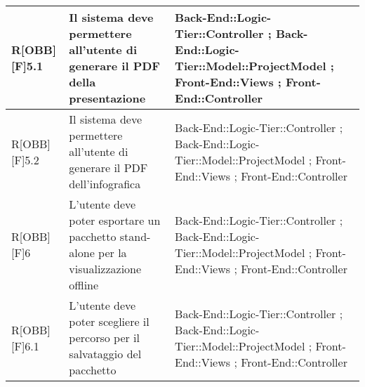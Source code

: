 \begin{table}[h]
\begin{tabular}{|p{}|p{}|p{}|}
			R[OBB][F]5.1 & Il sistema deve permettere all'utente di generare il PDF della presentazione & Back-End::Logic-Tier::Controller ; Back-End::Logic-Tier::Model::ProjectModel ; Front-End::Views ; Front-End::Controller \\ \midrule
			R[OBB][F]5.2 & Il sistema deve permettere all'utente di generare il PDF dell'infografica & Back-End::Logic-Tier::Controller ; Back-End::Logic-Tier::Model::ProjectModel ; Front-End::Views ; Front-End::Controller \\ \midrule
			R[OBB][F]6 & L'utente deve poter esportare un pacchetto stand-alone per la visualizzazione offline & Back-End::Logic-Tier::Controller ; Back-End::Logic-Tier::Model::ProjectModel ; Front-End::Views ; Front-End::Controller \\ \midrule
			R[OBB][F]6.1 & L'utente deve poter scegliere il percorso per il salvataggio del pacchetto & Back-End::Logic-Tier::Controller ; Back-End::Logic-Tier::Model::ProjectModel ; Front-End::Views ; Front-End::Controller \\ \midrule

		\end{tabular}
	\end{table}
	\newpage
	

